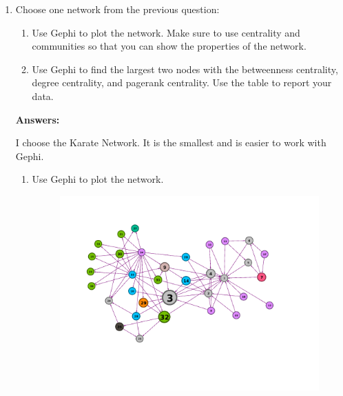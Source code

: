 \documentclass{amsart}
\theoremstyle{definition}
\theoremstyle{remark}
\numberwithin{equation}{section}
\begin{document}
\begin{enumerate}

\vspace{5cm}
\clearpage

\item Choose one network  from the previous question: \vspace{0.2cm}
\begin{enumerate}
\item Use Gephi to plot the network. Make sure to use centrality and communities so that you can show the properties of the network.
\item Use Gephi to find the largest two nodes with the betweenness centrality, degree centrality, and pagerank centrality. Use the table to report  your data.
\end{enumerate}

\vspace{0.5cm}

\textbf{Answers:}

I choose the Karate Network. It is the smallest and is easier to work with Gephi. \vspace{0.2cm}


\begin{enumerate}
\item Use Gephi to plot the network. 

\begin{figure}[h]
\includegraphics[width=1.0\linewidth]{images/hw3_figure2.PNG}
\end{figure}


\end{enumerate}
\end{enumerate}
\end{document}
